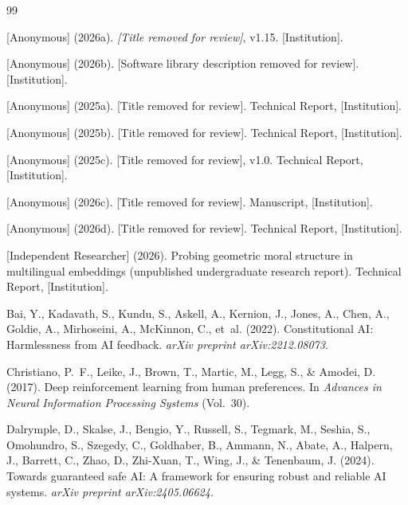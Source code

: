 \documentclass[12pt]{article}
\theoremstyle{definition}
\theoremstyle{remark}
\begin{document}
\begin{thebibliography}{99}

[Anonymous] (2026a). \textit{[Title removed for review]}, v1.15. [Institution].

[Anonymous] (2026b). [Software library description removed for review]. [Institution].

[Anonymous] (2025a). [Title removed for review]. Technical Report, [Institution].

[Anonymous] (2025b). [Title removed for review]. Technical Report, [Institution].

[Anonymous] (2025c). [Title removed for review], v1.0. Technical Report, [Institution].

[Anonymous] (2026c). [Title removed for review]. Manuscript, [Institution].

[Anonymous] (2026d). [Title removed for review]. Technical Report, [Institution].

[Independent Researcher] (2026). Probing geometric moral structure in multilingual embeddings (unpublished undergraduate research report). Technical Report, [Institution].

Bai, Y., Kadavath, S., Kundu, S., Askell, A., Kernion, J., Jones, A., Chen, A., Goldie, A., Mirhoseini, A., McKinnon, C., et~al. (2022). Constitutional AI: Harmlessness from AI feedback. \textit{arXiv preprint arXiv:2212.08073}.

Christiano, P.~F., Leike, J., Brown, T., Martic, M., Legg, S., \& Amodei, D. (2017). Deep reinforcement learning from human preferences. In \textit{Advances in Neural Information Processing Systems} (Vol.~30).

Dalrymple, D., Skalse, J., Bengio, Y., Russell, S., Tegmark, M., Seshia, S., Omohundro, S., Szegedy, C., Goldhaber, B., Ammann, N., Abate, A., Halpern, J., Barrett, C., Zhao, D., Zhi-Xuan, T., Wing, J., \& Tenenbaum, J. (2024). Towards guaranteed safe AI: A framework for ensuring robust and reliable AI systems. \textit{arXiv preprint arXiv:2405.06624}.


\end{thebibliography}
\end{document}
